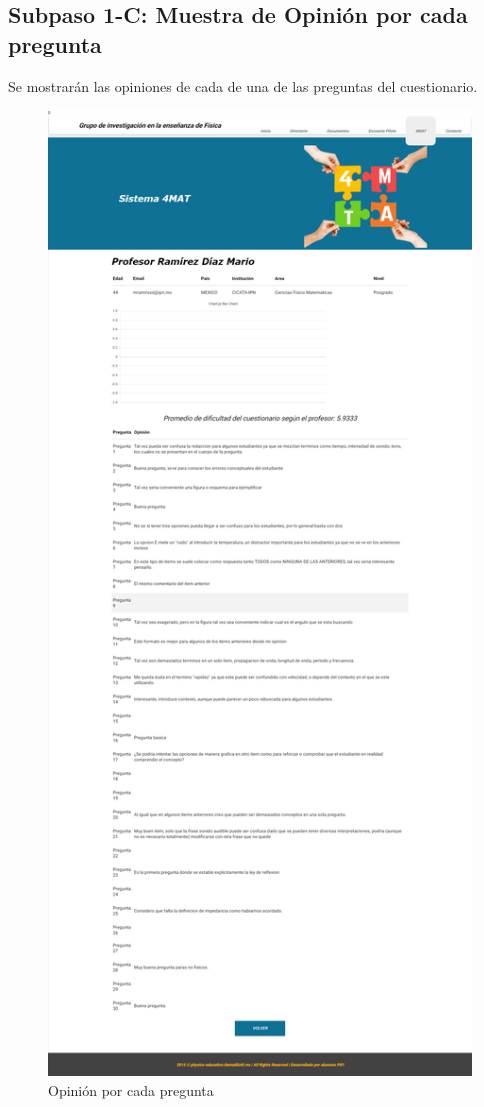 \subsection{Subpaso 1-C: Muestra de Opinión por cada pregunta}
Se mostrarán las opiniones de cada de una de las preguntas del cuestionario.
\begin{figure}[hbtp]

	\includegraphics[scale=0.3]{images/Interfaz/IUGS15_opinionPregunta.PNG}
	\caption{Opinión por cada pregunta }
	\end{figure}